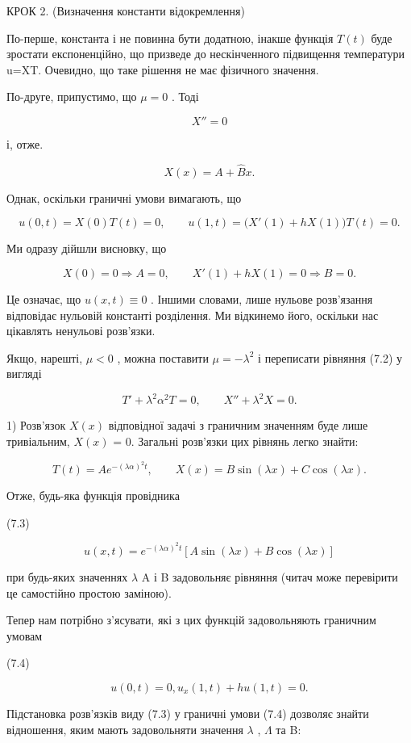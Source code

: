 \documentclass[
  ukrainian,
]{article}
\begin{document}
КРОК 2. (Визначення константи відокремлення)

По-перше, константа і не повинна бути додатною, інакше функція
\(T\left( t\right)\) буде зростати експоненційно, що призведе до
нескінченного підвищення температури u=XT. Очевидно, що таке рішення не
має фізичного значення.

По-друге, припустимо, що \(\mu = 0\) . Тоді

\[
X'' = 0
\]

і, отже.

\[
X(x) = A + \hat{B}x.
\]

Однак, оскільки граничні умови вимагають, що

\[
u(0, t) = X(0) T(t) = 0, \qquad u(1,t)=\bigl(X'(1)+hX(1)\bigr)T(t)=0.
\]

Ми одразу дійшли висновку, що

\[
X(0)=0\Rightarrow A=0,\qquad X'(1)+hX(1)=0\Rightarrow B=0.
\]

Це означає, що \(u(x, t) \equiv 0\) . Іншими словами, лише нульове
розв'язання відповідає нульовій константі розділення. Ми відкинемо його,
оскільки нас цікавлять ненульові розв'язки.

Якщо, нарешті, \(\mu < 0\) , можна поставити \(\mu = -\lambda^2\) і
переписати рівняння (7.2) у вигляді

\[
T' + \lambda^2 \alpha^2 T = 0, \qquad X'' + \lambda^2 X = 0.
\]

1) Розв'язок \(X(x)\) відповідної задачі з граничним значенням буде лише
тривіальним, \(X(x)\) = 0. Загальні розв'язки цих рівнянь легко знайти:

\[
T(t) = Ae^{-(\lambda \alpha)^2 t},
\qquad X(x) = B\sin(\lambda x) + C\cos(\lambda x).
\]

Отже, будь-яка функція провідника

(7.3)

\[
u(x, t) = e^{-(\lambda \alpha)^2 t} [A \sin(\lambda x) + B \cos(\lambda x)]
\]

при будь-яких значеннях \(\lambda\) A і B задовольняє рівняння (читач
може перевірити це самостійно простою заміною).

Тепер нам потрібно з'ясувати, які з цих функцій задовольняють граничним
умовам

(7.4)

\[
u(0, t) = 0, u_x(1, t) + hu(1, t) = 0.
\]

Підстановка розв'язків виду (7.3) у граничні умови (7.4) дозволяє знайти
відношення, яким мають задовольняти значення \(\lambda\) , \(\Lambda\)
та B:
\end{document}
